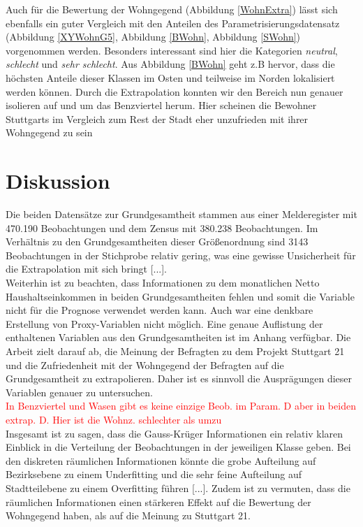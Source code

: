 \documentclass{Vorlage}
\begin{document}
Auch für die Bewertung der Wohngegend (Abbildung \ref{WohnExtra}) lässt sich ebenfalls ein guter Vergleich mit den Anteilen des Parametrisierungsdatensatz (Abbildung \ref{XYWohnG5}, Abbildung \ref{BWohn}, Abbildung \ref{SWohn}) vorgenommen werden. Besonders interessant sind hier die Kategorien \textit{neutral}, \textit{schlecht} und \textit{sehr schlecht}. Aus Abbildung \ref{BWohn} geht z.B hervor, dass die höchsten Anteile dieser Klassen im Osten und teilweise im Norden lokalisiert werden können. Durch die Extrapolation konnten wir den Bereich nun genauer isolieren auf und um das Benzviertel herum. Hier scheinen die Bewohner Stuttgarts im Vergleich zum Rest der Stadt eher unzufrieden mit ihrer Wohngegend zu sein


\clearpage
\section{Diskussion}
Die beiden Datensätze zur Grundgesamtheit stammen aus einer Melderegister mit 470.190 Beobachtungen und dem Zensus mit 380.238 Beobachtungen. Im Verhältnis zu den Grundgesamtheiten dieser Größenordnung sind 3143 Beobachtungen in der Stichprobe relativ gering, was eine gewisse Unsicherheit für die Extrapolation mit sich bringt [...].\\
Weiterhin ist zu beachten, dass Informationen zu dem monatlichen Netto Haushaltseinkommen in beiden Grundgesamtheiten fehlen und somit die Variable nicht für die Prognose verwendet werden kann. Auch war eine denkbare Erstellung von Proxy-Variablen nicht möglich. Eine genaue Auflistung der enthaltenen Variablen aus den Grundgesamtheiten ist im Anhang verfügbar. Die Arbeit zielt darauf ab, die Meinung der Befragten zu dem Projekt Stuttgart 21 und die Zufriedenheit mit der Wohngegend der Befragten auf die Grundgesamtheit zu extrapolieren. Daher ist es sinnvoll die Ausprägungen dieser Variablen genauer zu untersuchen.\\

\textcolor{red}{In Benzviertel und Wasen gibt es keine einzige Beob. im Param. D aber in beiden extrap. D. Hier ist die Wohnz. schlechter als umzu}\\
Insgesamt ist zu sagen, dass die Gauss-Krüger Informationen ein relativ klaren Einblick in die Verteilung der Beobachtungen in der jeweiligen Klasse geben. Bei den diskreten räumlichen Informationen könnte die grobe Aufteilung auf Bezirksebene zu einem Underfitting und die sehr feine Aufteilung auf Stadtteilebene zu einem Overfitting führen [...]. Zudem ist zu vermuten, dass die räumlichen Informationen einen stärkeren Effekt auf die Bewertung der Wohngegend haben, als auf die Meinung zu Stuttgart 21.
\end{document}
